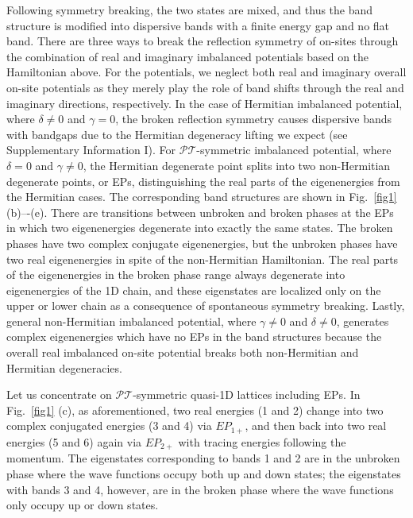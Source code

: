 \documentclass[report,epsfig,pre]{revtex4}
\begin{document}
Following symmetry breaking, the two states are mixed, and thus the band structure is modified into dispersive bands with a finite energy gap and no flat band. There are three ways to break the reflection symmetry of on-sites through the combination of real and imaginary imbalanced potentials based on the Hamiltonian above. For the potentials, we neglect both real and imaginary overall on-site potentials as they merely play the role of band shifts through the real and imaginary directions, respectively.
In the case of Hermitian imbalanced potential, where $\delta \neq 0$ and $\gamma=0$, the broken reflection symmetry causes dispersive bands with bandgaps due to the Hermitian degeneracy lifting we expect (see Supplementary Information I).
For $\mathcal{PT}$-symmetric imbalanced potential, where $\delta = 0$ and $\gamma \neq 0$, the Hermitian degenerate point splits into two non-Hermitian degenerate points, or EPs, distinguishing the real parts of the eigenenergies from the Hermitian cases. The corresponding band structures are shown in Fig.~\ref{fig1} (b)–-(e). There are transitions between unbroken and broken phases at the EPs in which two eigenenergies degenerate into exactly the same states. The broken phases have two complex conjugate eigenenergies, but the unbroken phases have two real eigenenergies in spite of the non-Hermitian Hamiltonian. The real parts of the eigenenergies in the broken phase range always degenerate into eigenenergies of the 1D chain, and these eigenstates are localized only on the upper or lower chain as a consequence of spontaneous symmetry breaking.
Lastly, general non-Hermitian imbalanced potential, where $\gamma \neq 0$ and $\delta \neq 0$, generates complex eigenenergies which have no EPs in the band structures because the overall real imbalanced on-site potential breaks both non-Hermitian and Hermitian degeneracies.




Let us concentrate on $\mathcal{PT}$-symmetric quasi-1D lattices including EPs. 
In Fig.~\ref{fig1} (c), as aforementioned, two real energies (1 and 2) change into two complex conjugated energies (3 and 4) via $EP_{1+}$, and then back into two real energies (5 and 6) again via $EP_{2+}$ with tracing energies following the momentum. The eigenstates corresponding to bands 1 and 2 are in the unbroken phase where the wave functions occupy both up and down states; the eigenstates with bands 3 and 4, however, are in the broken phase where the wave functions only occupy up or down states.
\end{document}
